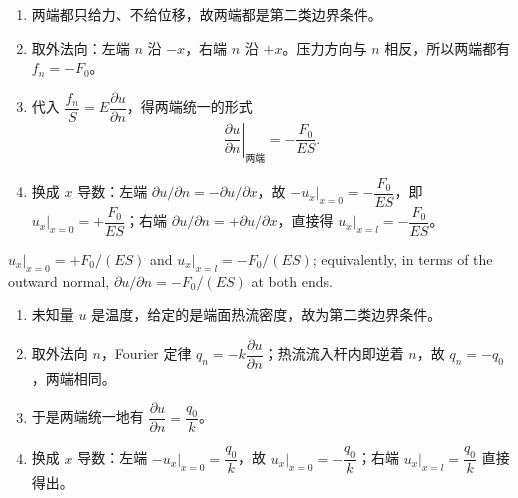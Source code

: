 

\begin{enumerate}
\item 两端都只给力、不给位移，故两端都是第二类边界条件。
\item 取外法向：左端 $n$ 沿 $-x$，右端 $n$ 沿 $+x$。压力方向与 $n$ 相反，所以两端都有 $f_n=-F_0$。
\item 代入 $\dfrac{f_n}{S}=E\dfrac{\partial u}{\partial n}$，得两端统一的形式
\[
\left.\frac{\partial u}{\partial n}\right|_{\text{两端}}=-\frac{F_0}{ES}.
\]
\item 换成 $x$ 导数：左端 $\partial u/\partial n=-\partial u/\partial x$，故 $-\left.u_x\right|_{x=0}=-\dfrac{F_0}{ES}$，即 $\left.u_x\right|_{x=0}=+\dfrac{F_0}{ES}$；右端 $\partial u/\partial n=+\partial u/\partial x$，直接得 $\left.u_x\right|_{x=l}=-\dfrac{F_0}{ES}$。
\end{enumerate}

{$\left.u_x\right|_{x=0}=+F_0/(ES)$ and $\left.u_x\right|_{x=l}=-F_0/(ES)$; equivalently, in terms of the outward normal, $\partial u/\partial n=-F_0/(ES)$ at both ends.}






\begin{enumerate}
\item 未知量 $u$ 是温度，给定的是端面热流密度，故为第二类边界条件。
\item 取外法向 $n$，Fourier 定律 $q_n=-k\dfrac{\partial u}{\partial n}$；热流流入杆内即逆着 $n$，故 $q_n=-q_0$，两端相同。
\item 于是两端统一地有 $\dfrac{\partial u}{\partial n}=\dfrac{q_0}{k}$。
\item 换成 $x$ 导数：左端 $-\left.u_x\right|_{x=0}=\dfrac{q_0}{k}$，故 $\left.u_x\right|_{x=0}=-\dfrac{q_0}{k}$；右端 $\left.u_x\right|_{x=l}=\dfrac{q_0}{k}$ 直接得出。
\end{enumerate}

